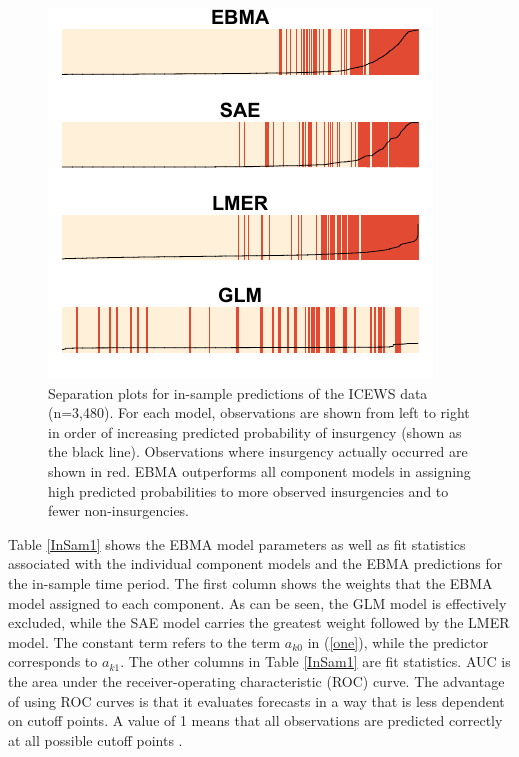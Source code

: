 \documentclass[pdftex,12pt,fullpage,oneside]{amsart}
\begin{document}
\begin{figure}
\hspace{-10pt}
\vspace{-15pt}
  \caption{\footnotesize Separation plots for in-sample predictions of
    the ICEWS data (n=3,480). For each model, observations are shown
    from left to right in order of increasing predicted probability of
    insurgency (shown as the black line). Observations where
    insurgency actually occurred are shown in red. EBMA outperforms
    all component models in assigning high predicted probabilities to
    more observed insurgencies and to fewer non-insurgencies.}
\label{InSam1sep}
\centering
\includegraphics[]{Insamplenew.pdf}
\vspace{-20pt}
\end{figure}



Table \ref{InSam1} shows the EBMA model parameters as well as fit
statistics associated with the individual component models and the
EBMA predictions for the in-sample time period. The first column shows
the weights that the EBMA model assigned to each component. As can be
seen, the GLM model is effectively excluded, while the SAE model
carries the greatest weight followed by the LMER model.  The constant
term refers to the term $a_{k0}$ in (\ref{one}), while the predictor
corresponds to $a_{k1}$.  The other columns in Table \ref{InSam1} are
fit statistics.  AUC is the area under the receiver-operating
characteristic (ROC) curve. The advantage of using ROC curves is that
it evaluates forecasts in a way that is less dependent on cutoff
points.  A value of 1 means that all observations are predicted
correctly at all possible cutoff points \citep{King:Zeng:2001}.
\end{document}
